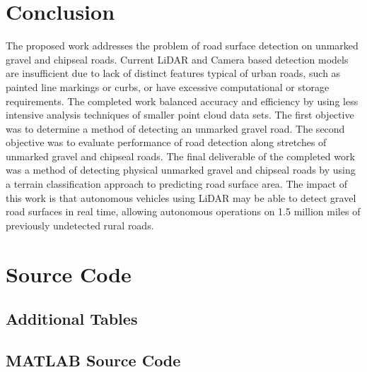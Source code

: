 \documentclass[numbered,pdftex]{ohio-etd}
\begin{document}
{{{	}
		
} %


\chapter{Conclusion}
{
	
	{The proposed work addresses the problem of road surface detection on unmarked gravel and chipseal roads. Current LiDAR and Camera based detection models are insufficient due to lack of distinct features typical of urban roads, such as painted line markings or curbs, or have excessive computational or storage requirements. The completed work balanced accuracy and efficiency by using less intensive analysis techniques of smaller point cloud data sets. The first objective was to determine a method of detecting an unmarked gravel road. The second objective was to evaluate performance of road detection along stretches of unmarked gravel and chipseal roads. The final deliverable of the completed work was a method of detecting physical unmarked gravel and chipseal roads by using a terrain classification approach to predicting road surface area. The impact of this work is that autonomous vehicles using LiDAR may be able to detect gravel road surfaces in real time, allowing autonomous operations on 1.5 million miles of previously undetected rural roads.}

}


\appendix

\chapter{Source Code}{
	
	\section{Additional Tables}{
	
	
	
	}
	
	\section{MATLAB Source Code}{
		
%			
%			
%			
%			
%				
		
}}}
\end{document}
